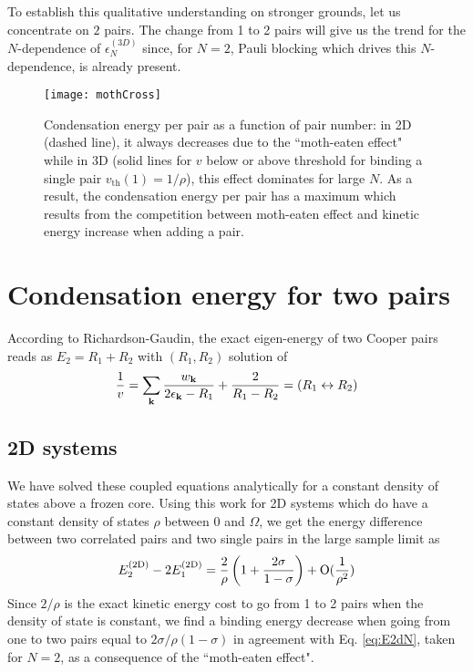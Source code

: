 \documentclass[5p,twocolumn]{elsarticle}
\begin{document}
To establish this qualitative understanding on stronger  grounds, let us concentrate on  $2$ pairs. The change from 1 to 2 pairs will give us the trend for the $N$-dependence of $\epsilon^{(3D)}_N$ since, for $N=2$, Pauli blocking which drives this $N$-dependence, is already present.  

\begin{figure}[htb]
	\centering
		\texttt{[image: mothCross]}
	\caption{Condensation energy per pair as a function of pair number: in 2D (dashed line), it always decreases due to the ``moth-eaten effect" while in 3D (solid lines for  $v$ below or above threshold for binding a single pair $v_{\text{th}}(1)=1/\rho$), this effect dominates for large $N$. As a result, the condensation energy per pair has a maximum which results from the competition between moth-eaten effect and kinetic energy increase when adding a pair.}
	\label{fig:3dCondChange}
\end{figure}

\section{Condensation energy for two pairs\label{sec:twoPair}}
According to Richardson-Gaudin, the exact eigen-energy of two Cooper pairs reads as $E_2=R_1+R_2$ with $(R_1,R_2)$ solution of
\begin{equation}
\frac{1}{v}=\sum_{\mathbf{k}}\frac{w_{\mathbf{k}}}{2\epsilon_{\mathbf{k}}-R_1}+\frac{2}{R_1-R_2}=(R_{1}\leftrightarrow{}R_{2})
\label{eq:richardsonEq}
\end{equation}

\subsection{2D systems}
We have solved these coupled equations analytically for a constant density of states above a frozen core\cite{combescotBCS}.  Using  this work  for 2D systems which do have a constant density of states $\rho$  between $0$ and $\Omega$, we get the energy difference between two correlated pairs and two single pairs in the large sample limit as 
\begin{equation}
E^{{{\text{(2D)}}}}_2-2E_1^{{{\text{(2D)}}}}=\frac{2}{\rho}\left(1+\frac{2\sigma}{1-\sigma}\right)+\text{O}(\frac{1}{\rho^2})
\end{equation}
 Since $2/\rho$  is the exact kinetic energy cost to go from 1 to 2 pairs when the density of state is constant, we find a binding energy decrease when going from one to two pairs equal to $2\sigma/\rho(1-\sigma)$ in agreement with Eq. \ref{eq:E2dN}, taken for $N=2$, as a consequence of the ``moth-eaten effect". 
\end{document}
